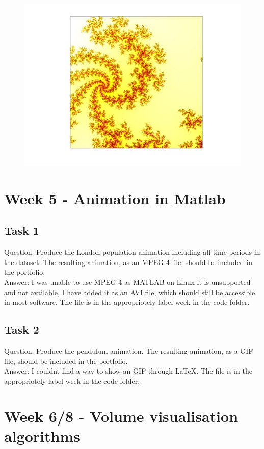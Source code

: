 \documentclass[12pt,a4paper]{report}
\begin{document}
\begin{figure}[H]
\centering
\includegraphics[width=\textwidth]{../Code/week 3/mendelbrot2.jpg} 
\end{figure}

\section{Week 5 - Animation in Matlab}
\subsection{Task 1}
Question: Produce the London population animation including all time-periods in the dataset. The resulting
animation, as an MPEG-4 file, should be included in the portfolio.
\\
Answer: I was unable to use MPEG-4 as MATLAB on Linux it is unsupported and not available, I have added it as an AVI file, which should still be accessible in most software. The file is in the appropriotely label week in the code folder.

\subsection{Task 2}
Question: Produce the pendulum animation. The resulting animation, as a GIF file, should be included in the
portfolio.
\\
Answer: I couldnt find a way to show an GIF through LaTeX. The file is in the appropriotely label week in the code folder.


\section{Week 6/8 - Volume visualisation algorithms}
\end{document}
